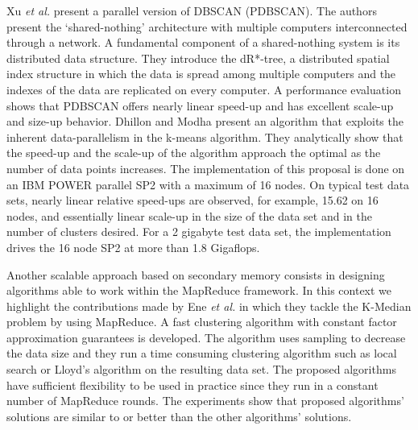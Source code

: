 \documentclass[smallextended]{svjour3}       %
\begin{document}
Xu \textit{et al.} \cite{XJK99} present a parallel version of DBSCAN (PDBSCAN). The authors present the ‘shared-nothing’ architecture with multiple computers interconnected through a network. A fundamental component of a shared-nothing system is its distributed data structure. They introduce the dR*-tree, a distributed spatial index structure in which the data is spread among multiple computers and the indexes of the data are replicated on every computer. A performance evaluation shows that PDBSCAN offers nearly linear speed-up and has excellent scale-up and size-up behavior. Dhillon and Modha  \cite{DM99} present an algorithm that exploits the inherent data-parallelism in the k-means algorithm. They analytically show that the speed-up and the scale-up of the algorithm approach the optimal as the number of data points increases. The implementation of this proposal is done on an IBM POWER parallel SP2 with a maximum of 16 nodes. On typical test data sets, nearly linear relative speed-ups are observed, for example, 15.62 on 16 nodes, and essentially linear scale-up in the size of the data set and in the number of clusters desired. For a 2 gigabyte test data set, the implementation drives the 16 node SP2 at more than 1.8 Gigaflops.

Another scalable approach based on secondary memory consists in designing algorithms able to work  within the MapReduce framework. %
In this context we highlight the contributions made %
by Ene \textit{et al.} \cite{EIM11} in which they tackle the K-Median problem by using MapReduce.
A fast clustering algorithm with constant factor approximation guarantees is developed. The algorithm uses sampling to decrease the data size and they run a time consuming clustering algorithm such as local search or Lloyd's algorithm on the resulting data set. The proposed algorithms have sufficient flexibility to be used in practice since they run in a constant number of MapReduce rounds. The experiments show that proposed algorithms' solutions are similar to or better than the other algorithms' solutions.
\end{document}
